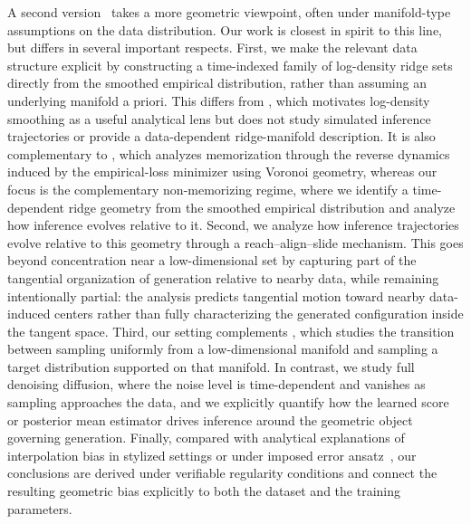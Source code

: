 \documentclass[11pt]{article}
\begin{document}
A second version~\citep{chen2025interpolation,baptista2025memorization,farghly2025diffusion,li2025scores} takes a more geometric viewpoint, often under manifold-type assumptions on the data distribution. Our work is closest in spirit to this line, but differs in several important respects. First, we make the relevant data structure explicit by constructing a time-indexed family of log-density ridge sets directly from the smoothed empirical distribution, rather than assuming an underlying manifold a priori. This differs from \cite{farghly2025diffusion}, which motivates log-density smoothing as a useful analytical lens but does not study simulated inference trajectories or provide a data-dependent ridge-manifold description. It is also complementary to \cite{baptista2025memorization}, which analyzes memorization through the reverse dynamics induced by the empirical-loss minimizer using Voronoi geometry, whereas our focus is the complementary non-memorizing regime, where we identify a time-dependent ridge geometry from the smoothed empirical distribution and analyze how inference evolves relative to it.   Second, we analyze how inference trajectories evolve relative to this geometry through a reach–align–slide mechanism. This goes beyond concentration near a low-dimensional set by capturing part of the tangential organization of generation relative to nearby data, while remaining intentionally partial: the analysis predicts tangential motion toward nearby data-induced centers rather than fully characterizing the generated configuration inside the tangent space. Third, our setting complements \cite{li2025scores}, which studies the transition between sampling uniformly from a low-dimensional manifold and sampling a target distribution supported on that manifold. In contrast, we study full denoising diffusion, where the noise level is time-dependent and vanishes as sampling approaches the data, and we explicitly quantify how the learned score or posterior mean estimator drives inference around the geometric object governing generation. Finally, compared with analytical explanations of interpolation bias in stylized settings or under imposed error ansatz~\citep[e.g.,][]{chen2025interpolation}, our conclusions are derived under verifiable regularity conditions and connect the resulting geometric bias explicitly to both the dataset and the training parameters.
\end{document}
